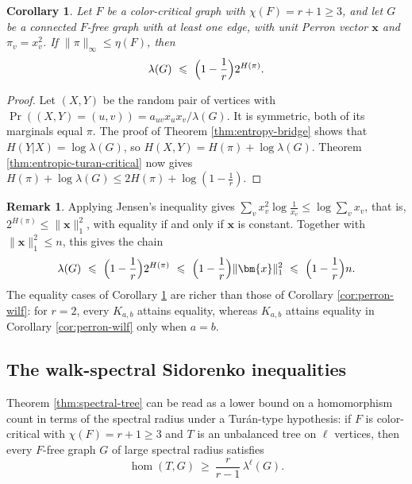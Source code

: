 \documentclass[11pt, a4paper]{article}
\newtheorem{corollary}[theorem]{Corollary}
\theoremstyle{definition}
\newtheorem{remark}{Remark}
\theoremstyle{plain}
\renewcommand{\le}{\leqslant}
\renewcommand{\ge}{\geqslant}
\begin{document}
\begin{corollary}\label{cor:entropic-perron-wilf}
Let $F$ be a color-critical graph with $\chi (F)=r+1\ge 3$, and let $G$ be a
connected $F$-free graph with at least one edge, with unit Perron vector
$\bm{x}$ and $\pi_v=x_v^{2}$. If $\lVert \pi \rVert_\infty \le \eta (F)$, then
\[
  \lambda (G)\ \le\ \Bigl(1-\frac1r\Bigr)2^{H(\pi )}.
\]
\end{corollary}

\begin{proof}
Let $(X,Y)$ be the random pair of vertices with 
$\Pr ((X,Y)=(u,v))= {a_{uv}x_ux_v}/{\lambda (G)}$. 
It is symmetric, both of its marginals equal $\pi$. 
The proof of Theorem
\ref{thm:entropy-bridge} shows that $H(Y| X)=\log \lambda (G)$, so $H(X,Y)=H(\pi )+\log \lambda (G)$. Theorem \ref{thm:entropic-turan-critical} now 
 gives $H(\pi )+\log \lambda (G)\le 2H(\pi )+\log (1-\frac1r)$.
\end{proof}


\begin{remark}\label{rem:entropic-vs-wilf}
Applying Jensen's inequality gives $\sum_v x_v^{2}\log \frac{1}{x_v}\le \log \sum_v x_v$, that is,
$2^{H(\pi )}\le \lVert \bm{x}\rVert_1^{2}$, with equality if and only if
$\bm{x}$ is constant. Together with
$\lVert \bm{x}\rVert_1^{2}\le n $, this gives the chain
\[
  \lambda (G)\ \le\ \Bigl(1-\frac1r\Bigr)2^{H(\pi )}
  \ \le\ \Bigl(1-\frac1r\Bigr)\lVert \bm{x}\rVert_1^{2}
  \ \le\ \Bigl(1-\frac1r\Bigr)n . 
\]
The equality cases of Corollary \ref{cor:entropic-perron-wilf} are richer than those of 
Corollary \ref{cor:perron-wilf}: for $r=2$,  
every $K_{a,b}$ attains equality, whereas $K_{a,b}$ attains
equality in Corollary \ref{cor:perron-wilf} only when $a=b$.
\end{remark}




\subsection{The walk-spectral Sidorenko inequalities}
\label{subsec:sidorenko}

Theorem \ref{thm:spectral-tree} can be read as a lower bound on a homomorphism count in terms of the spectral radius under a Tur\'{a}n-type hypothesis: if $F$ is color-critical with $\chi (F)=r+1\ge 3$ and $T$ is an unbalanced tree on $\ell$ vertices, then every $F$-free graph $G$
of large spectral radius satisfies
\begin{equation} \label{eq-bound-tree-hom}
  \hom (T,G)\ \ge\ \frac{r}{r-1}\,\lambda^{\ell}(G).
\end{equation} 
\end{document}
